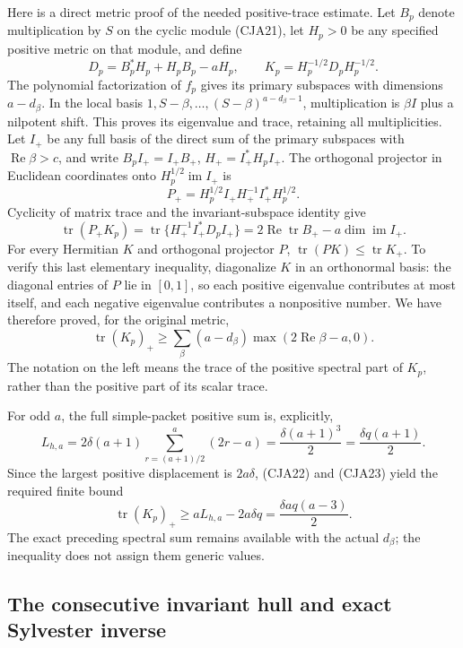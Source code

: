 \documentclass[11pt,a4paper]{article}
\begin{document}
Here is a direct metric proof of the needed positive-trace estimate.
Let \(B_p\) denote multiplication by \(S\) on the cyclic module
(CJA21), let \(H_p>0\) be any specified positive metric on that
module, and define
\[
 D_p=B_p^*H_p+H_pB_p-aH_p,\qquad
 K_p=H_p^{-1/2}D_pH_p^{-1/2}.
\]
The polynomial factorization of \(f_p\) gives its primary subspaces
with dimensions \(a-d_\beta\).
In the local basis \(1,S-\beta,\ldots,(S-\beta)^{a-d_\beta-1}\),
multiplication is \(\beta I\) plus a nilpotent shift.
This proves its eigenvalue and trace, retaining all multiplicities.
Let \(I_+\) be any full basis of the direct sum of the primary
subspaces with \(\operatorname{Re}\beta>c\), and write
\(B_pI_+=I_+B_+\), \(H_+=I_+^*H_pI_+\).
The orthogonal projector in Euclidean coordinates onto
\(H_p^{1/2}\operatorname{im}I_+\) is
\[
 P_+=H_p^{1/2}I_+H_+^{-1}I_+^*H_p^{1/2}.
 \]
Cyclicity of matrix trace and the invariant-subspace identity give
\[
 \operatorname{tr}(P_+K_p)
  =\operatorname{tr}\{H_+^{-1}I_+^*D_pI_+\}
  =2\operatorname{Re}\operatorname{tr}B_+
                  -a\dim\operatorname{im}I_+ .
\]
For every Hermitian \(K\) and orthogonal projector \(P\),
\(\operatorname{tr}(PK)\leq\operatorname{tr}K_+\).
To verify this last elementary inequality, diagonalize \(K\) in an
orthonormal basis: the diagonal entries of \(P\) lie in \([0,1]\),
so each positive eigenvalue contributes at most itself, and each
negative eigenvalue contributes a nonpositive number.
We have therefore proved, for the original metric,
\begin{equation}
 \operatorname{tr}(K_p)_+
 \geq\sum_{\beta}(a-d_\beta)
               \max(2\operatorname{Re}\beta-a,0).
 \tag{CJA23}
\end{equation}
The notation on the left means the trace of the positive spectral
part of \(K_p\), rather than the positive part of its scalar trace.

For odd \(a\), the full simple-packet positive sum is, explicitly,
\[
 L_{h,a}
 =2\delta(a+1)\sum_{r=(a+1)/2}^{a}(2r-a)
 =\frac{\delta(a+1)^3}{2}
 =\frac{\delta q(a+1)}2 .
\]
Since the largest positive displacement is \(2a\delta\), (CJA22)
and (CJA23) yield the required finite bound
\begin{equation}
 \operatorname{tr}(K_p)_+
 \geq aL_{h,a}-2a\delta q
 =\frac{\delta aq(a-3)}2 .
 \tag{CJA24}
\end{equation}
The exact preceding spectral sum remains available with the actual
\(d_\beta\); the inequality does not assign them generic values.

\subsection{The consecutive invariant hull and exact Sylvester inverse}
\end{document}
